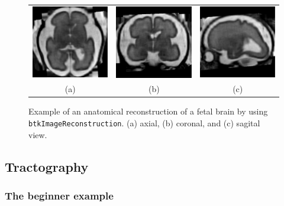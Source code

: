 \begin{figure}[t]
\centering
\begin{tabular}{ccc}
\includegraphics[width=0.3\columnwidth]{hr_axl.eps}&
\includegraphics[width=0.3\columnwidth]{hr_cor.eps}&
\includegraphics[width=0.3\columnwidth]{hr_sag.eps}\\
{(a)}&{(b)}&{(c)}\\
\end{tabular}
\caption{Example of an anatomical reconstruction of a fetal brain by using
\texttt{btkImageReconstruction}. (a) axial, (b) coronal, and (c) sagital view.}
\label{fig:reconstruction}
\end{figure}

\subsection{Tractography}
    \subsubsection*{The beginner example}
        

